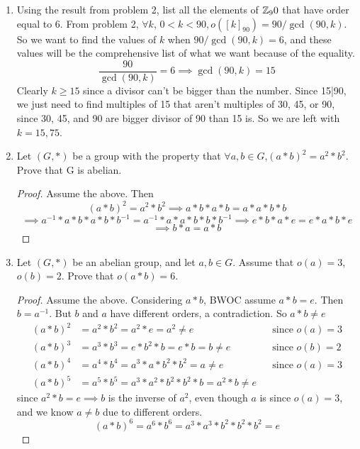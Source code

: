 \documentclass[12pt]{article}
\begin{document}
\begin{enumerate}
	\item Using the result from problem 2, list all the elements of $\mathbb{Z}_90$ that have order equal to 6.\m
	From problem 2, $\forall k$, $0<k<90, o([k]_90) = 90/\gcd(90,k)$. So we want to find the values of $k$ when $90/\gcd(90,k) = 6$, and these values will be the comprehensive list of what we want because of the equality.\\
	\[\frac{90}{\gcd(90,k)} = 6 \implies \gcd(90,k) = 15\]
	Clearly $k\geq15$ since a divisor can't be bigger than the number. Since 15|90, we just need to find multiples of 15 that aren't multiples of 30, 45, or 90, since 30, 45, and 90 are bigger divisor of 90 than 15 is. So we are left with $k=15,75$.
	
	\item Let $(G,*)$ be a group with the property that $\forall a,b \in G$,\medspace$(a*b)^2 = a^2 * b^2$. Prove that G is abelian.
	\begin{proof}
		Assume the above. Then 
		\[(a*b)^2 = a^2*b^2 \implies a*b*a*b = a*a*b*b\]
		\[\implies a^{-1}*a*b*a*b*b^{-1} = a^{-1}*a*a*b*b*b^{-1} \implies e*b*a*e = e*a*b*e\]
		\[\implies b*a = a*b\]
		
	\end{proof}
	
	\item Let $(G,*)$ be an abelian group, and let $a,b\in G$. Assume that $o(a) = 3$, $o(b) = 2$. Prove that $o(a*b) = 6$.
	\begin{proof}
		Assume the above.
		Considering $a*b$, BWOC assume $a*b=e$. Then $b=a^{-1}$. But $b$ and $a$ have different orders, a contradiction. So $a*b \neq e$\\
		\begin{align*}
			(a*b)^2 &= a^2*b^2 = a^2*e = a^2 \neq e &&\text{since $o(a)=3$}\\
			(a*b)^3 &= a^3*b^3 = e*b^2*b = e*b = b \neq e &&\text{since $o(b)=2$}\\
			(a*b)^4 &= a^4*b^4 = a^3*a*b^2*b^2 = a \neq e &&\text{since $o(a)=3$}\\
			(a*b)^5 &= a^5*b^5 = a^3*a^2*b^2*b^2*b = a^2*b \neq e
		\end{align*}
		since $a^2*b=e \implies b$ is the inverse of $a^2$, even though $a$ is since $o(a)=3$, and we know $a\neq b$ due to different orders.\\
		\[(a*b)^6 = a^6*b^6 = a^3*a^3*b^2*b^2*b^2 = e\]
	\end{proof}
	\end{enumerate}
\end{document}

